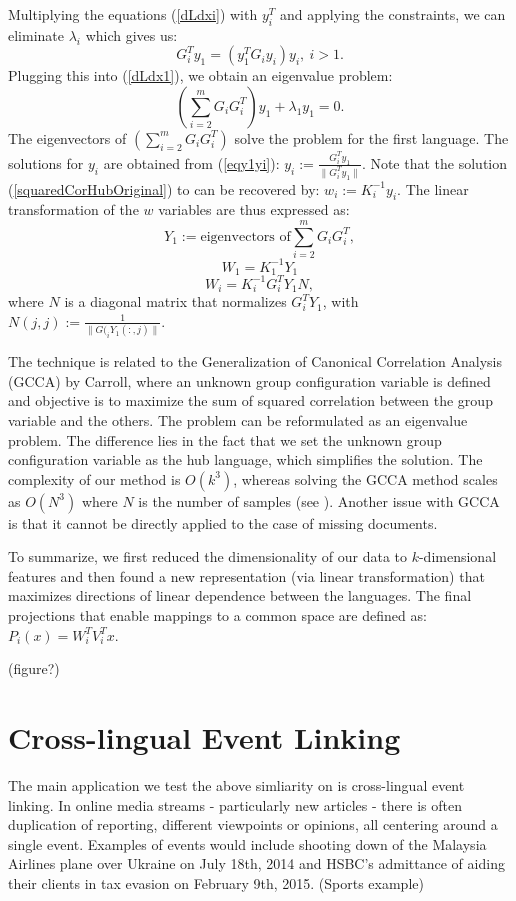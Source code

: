 \documentclass[twoside,11pt]{article}
\begin{document}
Multiplying the equations (\ref{dLdxi}) with $y_i^T$ and applying the constraints, we can eliminate $\lambda_i$ which gives us:
\begin{equation}\label{eqy1yi}
G_{i}^T y_1 = \left(y_1^T G_{i} y_i \right) y_i,~i > 1.
\end{equation}
Plugging this into (\ref{dLdx1}), we obtain an eigenvalue problem:
$$\left( \sum_{i = 2}^m G_i G_{i}^T \right) y_1 + \lambda_1 y_1 = 0.$$
The eigenvectors of $\left( \sum_{i = 2}^m G_i G_{i}^T \right)$ solve the problem for the first language. The solutions for $y_i$ are obtained from (\ref{eqy1yi}): $y_i := \frac{G_{i}^T y_1}{\| G_{i}^T y_1 \|}$.
Note that the solution (\ref{squaredCorHubOriginal}) to can be recovered by: $w_i := K_i^{-1} y_i$. The linear transformation of the $w$ variables are thus expressed as:
$$ Y_1 := \text{eigenvectors of} \sum_{i = 2}^m G_i G_{i}^T, $$
$$ W_1 = K_1^{-1} Y_1 $$
$$ W_i = K_i^{-1} G_{i}^T Y_1 N,$$
where $N$ is a diagonal matrix that normalizes $G_{i}^T Y_1$, with $N(j,j) := \frac{1}{\|G(_{i} Y_1(:,j)\|}$.

 The technique is related to the Generalization of Canonical Correlation Analysis (GCCA) by Carroll\cite{Carroll}, where an unknown group configuration variable is defined and objective is to maximize the sum of squared correlation between the group variable and the others. The problem can be reformulated as an eigenvalue problem. The difference lies in the fact that we set the unknown group configuration variable as the hub language, which simplifies the solution. The complexity of our method is $O(k^3)$, whereas solving the GCCA method scales as $O(N^3)$ where $N$ is the number of samples (see \cite{gifi}). Another issue with GCCA is that it cannot be directly applied to the case of missing documents.

To summarize, we first reduced the dimensionality of our data to $k$-dimensional features and then found a new representation (via linear transformation) that maximizes directions of linear dependence between the languages. The final projections that enable mappings to a common space are defined as: $P_i(x) = W_i^T V_i^T x.$

(figure?)


\section{Cross-lingual Event Linking}
The main application we test the above simliarity on  is cross-lingual event linking. In online media streams - particularly new articles - there is often duplication of reporting, different viewpoints or opinions, all centering around a single event.  Examples of events would include shooting down of the Malaysia Airlines plane over Ukraine on July 18th, 2014 and HSBC's admittance of aiding their clients in tax evasion on February 9th, 2015. (Sports example)
\end{document}

